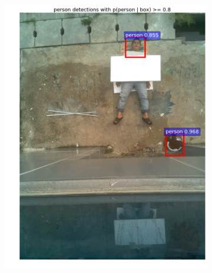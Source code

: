 \begin{figure}[ht]
\begin{subfigure}[b]{0.27\textwidth}
    \includegraphics[width=\textwidth]{3}
    \caption{}
  \end{subfigure}             
  \begin{subfigure}[b]{0.27\textwidth}

\end{subfigure}
\end{figure}
